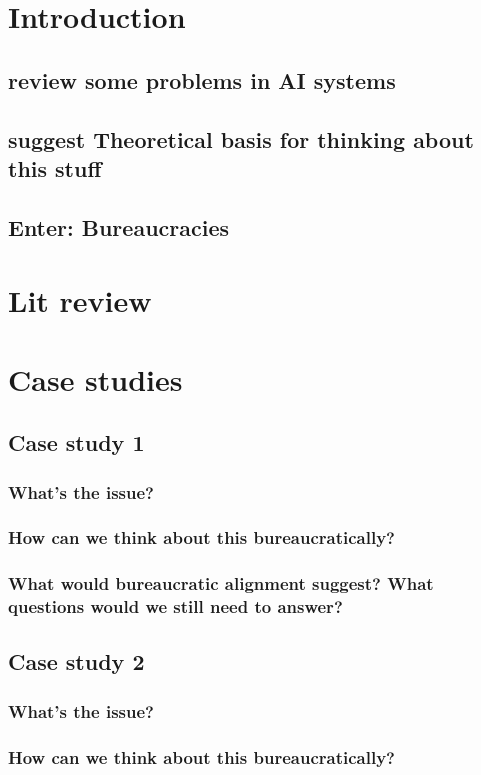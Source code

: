 \documentclass[main]{subfiles}
\begin{document}
\section{Introduction}
\subsection{review some problems in AI systems}
\subsection{suggest Theoretical basis for thinking about this stuff}
\subsection{Enter: Bureaucracies}
\section{Lit review}
\section{Case studies}

\subsection{Case study 1}
\subsubsection{What's the issue?}
\subsubsection{How can we think about this bureaucratically?}
\subsubsection{What would bureaucratic alignment suggest? What questions would we still need to answer?}

\subsection{Case study 2}
\subsubsection{What's the issue?}
\subsubsection{How can we think about this bureaucratically?}
\end{document}

